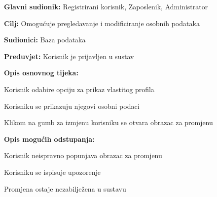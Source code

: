 \noindent {}
\begin{packed_item}
	
	\item \textbf{Glavni sudionik: } Registrirani korisnik, Zaposlenik, Administrator
	\item  \textbf{Cilj:} Omogućuje pregledavanje i modificiranje osobnih podataka
	\item  \textbf{Sudionici:} Baza podataka
	\item  \textbf{Preduvjet:} Korisnik je prijavljen u sustav
	\item  \textbf{Opis osnovnog tijeka:}
	
	\item[] \begin{packed_enum}
		
		\item Korisnik odabire opciju za prikaz vlastitog profila
		\item Korisniku se prikazuju njegovi osobni podaci
		\item Klikom na gumb za izmjenu korisniku se otvara obrazac za promjenu
		
	\end{packed_enum}
	
	\item  \textbf{Opis mogućih odstupanja:}
	
	\item[] \begin{packed_item}
		
		\item[2.a] Korisnik neispravno popunjava obrazac za promjenu
		\item[] \begin{packed_enum}
			
			\item Korisniku se ispisuje upozorenje
			\item Promjena ostaje nezabilježena u sustavu
			
		\end{packed_enum}
	\end{packed_item}
\end{packed_item}

